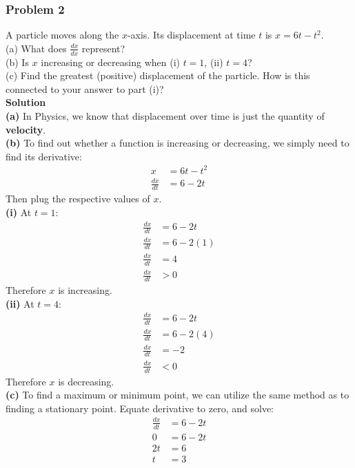 \documentclass[hidelinks, a4paper, 12pt]{article}
\newcommand{\bd}{\textbf}
\newcommand{\n}{\\[\baselineskip]}
\begin{document}
            \subsubsection{Problem 2}
                A particle moves along the $x$-axis. Its displacement at time $t$ is $x = 6t - t^2$.\n
                (a) What does $\frac{dx}{dx}$ represent?\n
                (b) Is $x$ increasing or decreasing when (i) $t = 1$, (ii) $t = 4$?\n
                (c) Find the greatest (positive) displacement of the particle. How is this connected to your answer to part (i)?\n
                \bd{Solution}\n
                \bd{(a)} In Physics, we know that displacement over time is just the quantity of \bd{velocity}.\n
                \bd{(b)} To find out whether a function is increasing or decreasing, we simply need to find its derivative:
                \[\begin{split}
                    x &= 6t - t^2\\
                    \frac{dx}{dt} &= 6 - 2t
                \end{split}\]
                Then plug the respective values of $x$.\n
                \bd{(i)} At $t = 1$:
                \[\begin{split}
                    \frac{dx}{dt} &= 6 - 2t\\
                    \frac{dx}{dt} &= 6 - 2(1)\\
                    \frac{dx}{dt} &= 4\\
                    \frac{dx}{dt} &> 0
                \end{split}\]
                Therefore $x$ is increasing.\n
                \bd{(ii)} At $t = 4$:
                \[\begin{split}
                    \frac{dx}{dt} &= 6 - 2t\\
                    \frac{dx}{dt} &= 6 - 2(4)\\
                    \frac{dx}{dt} &= -2\\
                    \frac{dx}{dt} &< 0
                \end{split}\]
                Therefore $x$ is decreasing.\n
                \bd{(c)} To find a maximum or minimum point, we can utilize the same method as to finding a stationary point. Equate derivative to zero, and solve:
                \[\begin{split}
                    \frac{dx}{dt} &= 6 - 2t\\
                    0 &= 6 - 2t\\
                    2t &= 6\\
                    t &= 3
                \end{split}\]
\end{document}
